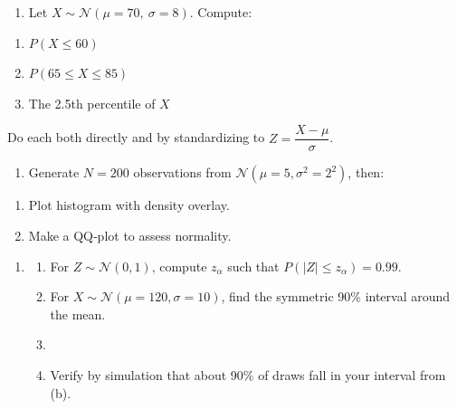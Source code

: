 \documentclass[
  letterpaper,
  DIV=11,
  numbers=noendperiod]{scrartcl}
\providecommand{\tightlist}{%
  \setlength{\itemsep}{0pt}\setlength{\parskip}{0pt}}\usepackage{longtable,booktabs,array}
\begin{document}
\begin{enumerate}
\def\labelenumi{\arabic{enumi}.}
\setcounter{enumi}{9}
\tightlist
\item
  Let \(X \sim \mathcal N(\mu=70,\ \sigma=8)\). Compute:
\end{enumerate}

\begin{enumerate}
\def\labelenumi{(\alph{enumi})}
\item
  \(P(X \le 60)\)
\item
  \(P(65 \le X \le 85)\)
\item
  The 2.5th percentile of \(X\)
\end{enumerate}

Do each both directly and by standardizing to
\(Z=\dfrac{X-\mu}{\sigma}\).

\begin{enumerate}
\def\labelenumi{\arabic{enumi}.}
\setcounter{enumi}{10}
\item
  Generate \(N=200\) observations from
  \(\mathcal N(\mu = 5, \sigma^2=2^2)\), then:
\end{enumerate}

\begin{enumerate}
\def\labelenumi{(\alph{enumi})}
\item
  Plot histogram with density overlay.
\item
  Make a QQ‑plot to assess normality.
\end{enumerate}

\begin{enumerate}
\def\labelenumi{\arabic{enumi}.}
\setcounter{enumi}{11}
\item
  \begin{enumerate}
  \def\labelenumii{(\alph{enumii})}
  \item
    For \(Z \sim \mathcal N(0,1)\), compute \(z_\alpha\) such that
    \(P(|Z| \le z_\alpha) = 0.99\).
  \item
    For \(X \sim \mathcal N(\mu = 120, \sigma=10)\), find the symmetric
    90\% interval around the mean.
  \item
  \item
    Verify by simulation that about 90\% of draws fall in your interval
    from (b).
  \end{enumerate}
\end{enumerate}
\end{document}
